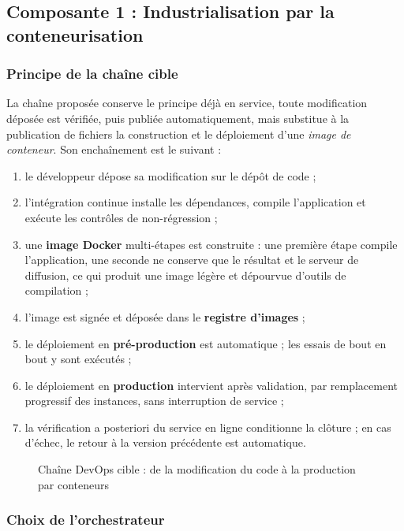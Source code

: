 \subsection{Composante 1 : Industrialisation par la conteneurisation}

\subsubsection{Principe de la chaîne cible}

La chaîne proposée conserve le principe déjà en service, toute modification
déposée est vérifiée, puis publiée automatiquement, mais substitue à la
publication de fichiers la construction et le déploiement d'une \emph{image de
conteneur}. Son enchaînement est le suivant :

\begin{enumerate}
  \item le développeur dépose sa modification sur le dépôt de code ;
  \item l'intégration continue installe les dépendances, compile l'application
        et exécute les contrôles de non-régression ;
  \item une \textbf{image Docker} multi-étapes est construite : une première
        étape compile l'application, une seconde ne conserve que le résultat et
        le serveur de diffusion, ce qui produit une image légère et dépourvue
        d'outils de compilation ;
  \item l'image est signée et déposée dans le \textbf{registre d'images} ;
  \item le déploiement en \textbf{pré-production} est automatique ; les essais
        de bout en bout y sont exécutés ;
  \item le déploiement en \textbf{production} intervient après validation, par
        remplacement progressif des instances, sans interruption de service ;
  \item la vérification a posteriori du service en ligne conditionne la
        clôture ; en cas d'échec, le retour à la version précédente est
        automatique.
\end{enumerate}

\begin{figure}[htbp]
\centering
{}
\caption{Chaîne DevOps cible : de la modification du code à la production par conteneurs}
\label{fig:devops-cible}
\end{figure}

\subsubsection{Choix de l'orchestrateur}


